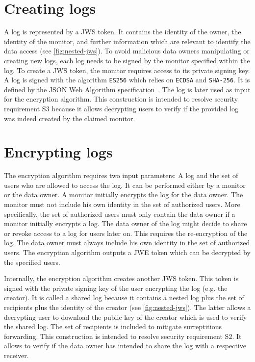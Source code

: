 \documentclass[../main.tex]{subfiles}
\begin{document}
\section{Creating logs}
\label{sec:signing}
A log is represented by a JWS token.
It contains the identity of the owner, the identity of the monitor, and further information which are relevant to identify the data access (see \cref{fig:nested-jws}).
To avoid malicious data owners manipulating or creating new logs, each log needs to be signed by the monitor specified within the log.
To create a JWS token, the monitor requires access to its private signing key.
A log is signed with the algorithm \verb|ES256| which relies on \verb|ECDSA| and \verb|SHA-256|.
It is defined by the JSON Web Algorithm specification~\cite{JWA2015}.
The log is later used as input for the encryption algorithm.
This construction is intended to resolve security requirement S3 because it allows decrypting users to verify if the provided log was indeed created by the claimed monitor.

\section{Encrypting logs}\label{sec:encrypting}

The encryption algorithm requires two input parameters: A log and the set of users who are allowed to access the log.
It can be performed either by a monitor or the data owner.
A monitor initially encrypts the log for the data owner.
The monitor must not include his own identity in the set of authorized users.
More specifically, the set of authorized users must only contain the data owner if a monitor initially encrypts a log.
The data owner of the log might decide to share or revoke access to a log for users later on.
This requires the re-encryption of the log.
The data owner must always include his own identity in the set of authorized users.
The encryption algorithm outputs a JWE token which can be decrypted by the specified users.

Internally, the encryption algorithm creates another JWS token.
This token is signed with the private signing key of the user encrypting the log (e.g. the creator).
It is called a shared log because it contains a nested log plus the set of recipients plus the identity of the creator (see \cref{fig:nested-jws}).
The latter allows a decrypting user to download the public key of the creator which is used to verify the shared log.
The set of recipients is included to mitigate surreptitious forwarding.
This construction is intended to resolve security requirement S2.
It allows to verify if the data owner has intended to share the log with a respective receiver.
 
\end{document}
